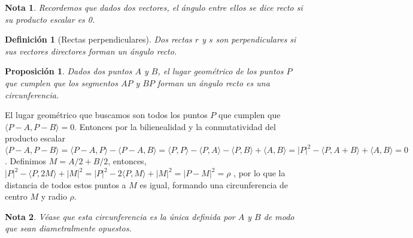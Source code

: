\documentclass[11pt, a4paper]{article}
\makeatletter
\newif\IfInSansMode
\let\oldsf\sffamily
\renewcommand*{\sffamily}{\oldsf\mathversion{sans}\InSansModetrue}
\let\oldnorm\normalfont
\renewcommand*{\normalfont}{\oldnorm\InSansModefalse\mathversion{normal}}
\renewenvironment{proof}[1][\proofname] {\vspace{-15pt}\par\pushQED{\qed}\normalfont\topsep6\p@\@plus6\p@\relax\trivlist\item[\hskip\labelsep\it#1\@addpunct{.}]\ignorespaces}{\popQED\endtrivlist\@endpefalse}
\renewenvironment{proof}[1][\proofname] {\par\pushQED{\qed}\normalfont\topsep6\p@\@plus6\p@\relax\trivlist\item[\hskip\labelsep\itshape\sffamily#1\@addpunct{.}]\ignorespaces}{\popQED\endtrivlist\@endpefalse}
\theoremstyle{theorem-style}
\newtheorem{nprop}{Proposición}[section]
\theoremstyle{definition-style}
\newtheorem{ndef}{Definición}[section]
\theoremstyle{remark-style}
\newtheorem*{nota}{Nota}
\theoremstyle{example-style}
\makeatother
\begin{document}
\begin{nota} Recordemos que dados dos vectores, el ángulo entre ellos se dice recto si su producto escalar es 0.
\end{nota}

\begin{ndef}[Rectas perpendiculares]
  Dos rectas $r$ y $s$ son perpendiculares si sus vectores directores forman un ángulo recto.
\end{ndef}

\begin{nprop}
  Dados dos puntos $A$ y $B$, el lugar geométrico de los puntos $P$ que cumplen que los segmentos $AP$ y $BP$ forman un ángulo recto es una circunferencia.
\end{nprop}

\begin{proof}
	El lugar geométrico que buscamos son todos los puntos $P$ que cumplen que $\langle P-A, P-B\rangle =0$. Entonces por la bilienealidad y la conmutatividad del producto escalar $\langle P-A,P-B\rangle  = \langle P-A,P\rangle  - \langle  P-A,B\rangle  = \langle P,P\rangle  - \langle P,A\rangle  - \langle P,B\rangle  + \langle A,B\rangle  = | P|^2 - \langle P,A+B\rangle  + \langle A,B\rangle  = 0  $. Definimos $M=A/2+B/2 $, entonces, %
	$|P|^2 - \langle P,2M\rangle  + |M|^2 = |P|^2 - 2\langle P,M\rangle  + |M|^2 = |P-M|^2 = \rho$ ,  por lo que la distancia de todos estos puntos a $M$ es igual, formando una circunferencia de centro $M$ y radio $\rho$. 
\end{proof}

\begin{nota}
	Véase que esta circunferencia es la única definida por $A$ y $B$ de modo que sean diametralmente opuestos.
\end{nota}
\end{document}
